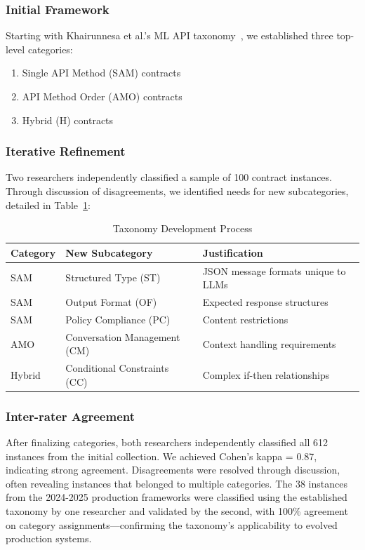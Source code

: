 \documentclass[11pt]{article}
\begin{document}
\subsubsection{Initial Framework}
Starting with Khairunnesa et al.'s ML API taxonomy~\cite{khairunnesa2023}, we established three top-level categories:
\begin{enumerate}
    \item Single API Method (SAM) contracts
    \item API Method Order (AMO) contracts  
    \item Hybrid (H) contracts
\end{enumerate}

\subsubsection{Iterative Refinement}
Two researchers independently classified a sample of 100 contract instances. Through discussion of disagreements, we identified needs for new subcategories, detailed in Table~\ref{tab:taxonomy_development}:

\begin{table}[h]
\centering
\caption{Taxonomy Development Process}
\label{tab:taxonomy_development}
\begin{tabular}{llp{7cm}}
\toprule
\textbf{Category} & \textbf{New Subcategory} & \textbf{Justification} \\
\midrule
SAM & Structured Type (ST) & JSON message formats unique to LLMs \\
SAM & Output Format (OF) & Expected response structures \\
SAM & Policy Compliance (PC) & Content restrictions \\
AMO & Conversation Management (CM) & Context handling requirements \\
Hybrid & Conditional Constraints (CC) & Complex if-then relationships \\
\bottomrule
\end{tabular}
\end{table}

\subsubsection{Inter-rater Agreement}
After finalizing categories, both researchers independently classified all 612 instances from the initial collection. We achieved Cohen's kappa = 0.87, indicating strong agreement. Disagreements were resolved through discussion, often revealing instances that belonged to multiple categories. The 38 instances from the 2024-2025 production frameworks were classified using the established taxonomy by one researcher and validated by the second, with 100\% agreement on category assignments—confirming the taxonomy's applicability to evolved production systems.
\end{document}
